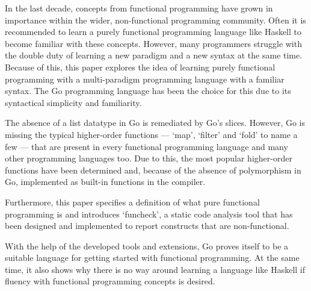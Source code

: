 
In the last decade, concepts from functional programming have grown in
importance within the wider, non-functional programming community.
Often it is recommended to learn a purely functional programming language
like Haskell to become familiar with these concepts.
However, many programmers struggle with the double duty
of learning a new paradigm and a new syntax at the same time. Because of
this, this paper explores the idea of learning purely functional programming %
with a multi-paradigm programming language with a familiar syntax. The Go
programming language has been the choice for this due to its syntactical
simplicity and familiarity.

The absence of a list datatype in Go is remediated by Go's slices.
However, Go is missing the typical higher-order functions ---
`map', `filter' and `fold' to name a few --- that are present in every
functional programming language and many other programming languages too. Due to
this, the most popular higher-order functions have been determined and, because of the
absence of polymorphism in Go, implemented as built-in functions in the compiler.

Furthermore, this paper specifies a definition of what pure functional programming is and
introduces `funcheck', a static code analysis tool that has been designed and implemented to
report constructs that are non-functional.

With the help of the developed tools and extensions, Go proves itself to be
a suitable language for getting started with functional programming.
At the same time, it also shows why there is no way around learning a
language like Haskell if fluency with functional programming concepts
is desired.
